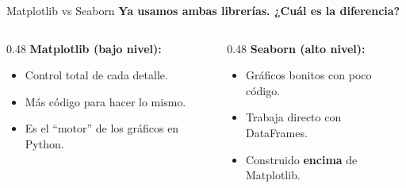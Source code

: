 \documentclass[aspectratio=169, 11pt]{beamer}
\begin{document}
\begin{frame}{Matplotlib vs Seaborn}
  \vspace{-4pt}
  {\footnotesize\color{arcaDark}\bfseries
    Ya usamos ambas librerías. ¿Cuál es la diferencia?}

  \vspace{6pt}
  \begin{columns}[T]
    \begin{column}{0.48\textwidth}
      {\footnotesize\bfseries\color{codeBlue}\faCogs\hspace{4pt}
        Matplotlib (bajo nivel):}
      \vspace{4pt}

      {\scriptsize
      \begin{itemize}\setlength{\itemsep}{3pt}
        \item Control total de cada detalle.
        \item Más código para hacer lo mismo.
        \item Es el ``motor'' de los gráficos en Python.
      \end{itemize}
      }

      \vspace{4pt}
      \begin{center}
      \end{center}
    \end{column}

    \begin{column}{0.48\textwidth}
      {\footnotesize\bfseries\color{arcaRed}\faChartBar\hspace{4pt}
        Seaborn (alto nivel):}
      \vspace{4pt}

      {\scriptsize
      \begin{itemize}\setlength{\itemsep}{3pt}
        \item Gráficos bonitos con poco código.
        \item Trabaja directo con DataFrames.
        \item Construido \textbf{encima} de Matplotlib.
      \end{itemize}
      }


\end{column}
\end{columns}
\end{frame}
\end{document}
